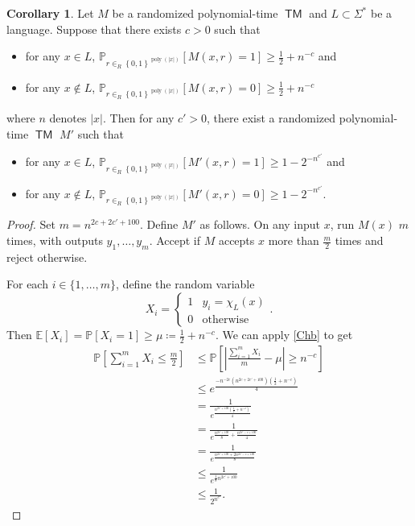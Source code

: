 \documentclass[10pt,letterpaper,cm]{nupset}
\theoremstyle{definition}
\theoremstyle{theorem}
\newtheorem{corollary}[definition]{Corollary}
\theoremstyle{remark}
\newcommand{\1}{\mathbf{1}}
\newcommand{\0}{\vec 0}
\DeclareMathOperator{\TM}{\mathsf{TM}}
\DeclareMathOperator{\poly}{poly}
\begin{document}
\begin{corollary}
Let $M$ be a randomized polynomial-time $\TM$ and $L\subset \Sigma^{\ast}$ be a language. Suppose that there exists $c>0$ such that
\begin{itemize}
\item for any $x\in L$, $\mathbb{P}_{r\in_R \left\{0,1\right\}^{\poly(\left\lvert{x}\right\rvert)}}\left[M(x,r)=1\right] \geq \frac{1}{2} +n^{-c}$ and
\item for any $x\notin L$, $\mathbb{P}_{r\in_R \left\{0,1\right\}^{\poly(\left\lvert{x}\right\rvert)}}\left[M(x,r)=0\right] \geq \frac{1}{2} + n^{-c}$
\end{itemize} where $n$ denotes $\left\lvert{x}\right\rvert$.
Then for any $c' >0$, there exist a randomized polynomial-time $\TM$ $M'$ such that 
\begin{itemize}
\item for any $x\in L$, $\mathbb{P}_{r\in_R \left\{0,1\right\}^{\poly(\left\lvert{x}\right\rvert)}}\left[M'(x,r)=1\right] \geq 1 - 2^{{-}n^{c'}}$ and
\item for any $x\notin L$, $\mathbb{P}_{r\in_R \left\{0,1\right\}^{\poly(\left\lvert{x}\right\rvert)}}\left[M'(x,r)=0\right] \geq 1 - 2^{{-}n^{c'}}$.
\end{itemize}
\end{corollary}
\begin{proof}
Set $m = n^{2c + 2c' + 100}$. Define $M'$ as follows. On any input $x$, run $M(x)$ $m$ times, with outputs $y_1, \ldots, y_m$. Accept if $M$ accepts $x$ more than $\frac{m}{2}$ times and reject otherwise.

\medskip

  For each $i\in \{1, \ldots, m\}$, define the random variable $$ X_i = \begin{cases} 1 & y_i = \chi_L(x) \\ 0 & \text{otherwise} \end{cases} .$$ Then $\mathbb{E}[X_i] = \mathbb{P}[X_i=1] \geq \mu\coloneqq \frac{1}{2} + n^{{-}c}$. We can apply \cref{Chb} to get   
\begin{align*}
 \mathbb{P}\left[\sum_{i=1}^m X_i \leq \frac{m}{2}\right] & \leq \mathbb{P}\left[ \left\lvert{\frac{\sum_{i=1}^m X_i}{m} -\mu}\right\rvert \geq n^{-c}\right] 
\\ & \leq
 e^{ \frac{ {-}n^{{-2}c}(n^{2c + 2c' + 100})(\frac{1}{2}+ n^{-c})}{4}
 }
 \\ & = \frac{1}{e^{\frac{ n^{2c' +100}(\frac{1}{2} + n^{{-}c} )                 }{  4   }}  }
 \\ & = \frac{1}{e^{ \frac{n^{2c' +100}}{8} +\frac{n^{2c' -c+100}}{4}          }}
 \\ & =  \frac{1}{e^{ \frac{n^{2c' +100} + 2 n^{2c' -c+100}}{8}       }}
 \\ &
 \leq \frac{1}{e^{\frac{1}{8}n^{2c' +100}}   }
 \\ & \leq \frac{1}{2^{n^{c'}}} . 
\end{align*} 
\end{proof}
\end{document}

